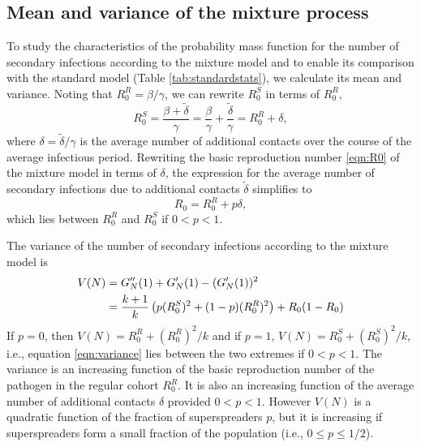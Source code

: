 \documentclass{imammb}
\numberwithin{equation}{section}
\begin{document}


\subsection{Mean and variance of the mixture process} %
To study the characteristics of the probability mass function for the number of secondary infections according to the mixture model and to enable its comparison with the standard model (Table \ref{tab:standardstats}), we calculate its mean and variance.  Noting that $R_0^R = \beta/\gamma$,  we can rewrite $R_0^S$ in terms of $R_0^R$,
\begin{equation}
R_0^S = \frac{\beta + \tilde{\delta}}{\gamma} = \frac{\beta}{\gamma} + \frac{ \tilde{\delta}}{\gamma} = R_0^R + \delta, 
\end{equation}
where $\delta =\tilde{\delta}/\gamma$ is the average number of additional contacts over the course of the average infectious period.  Rewriting the basic reproduction number \eqref{eqn:R0} of the mixture model  in terms of $\delta$, the expression for the average number of secondary infections due to additional contacts $\tilde{\delta}$ simplifies to 
\begin{equation}\label{eqn:R0delta}
R_0 = R_0^R + p \delta,
\end{equation}
which lies between $R_0^R$ and $R_0^S$ if $0<p<1$. 

The variance of the number of secondary infections according to the mixture model is %
\begin{align}\label{eqn:variance}
V(N) &= G_N''(1) + G_N'(1) -  (G_N'(1))^2 \notag \\ &= \frac{k+1}{k} \left (p (R_0^S)^2 + (1-p) (R_0^R)^2  \right ) +R_0(1-R_0)%
\end{align}
If $p=0$, then $V(N) = R_0^R + (R_0^R)^2/k$ and if $p=1$, $V(N) = R_0^S + (R_0^S)^2/k$, i.e., equation \eqref{eqn:variance} lies between the two extremes if $0<p<1$. The variance is an increasing function of the basic reproduction number of the pathogen in the regular cohort $R_0^R$. It is also an increasing function of the average number of additional contacts $\delta$ provided $0<p<1$. However $V(N)$ is a quadratic function of the fraction of superspreaders $p$, but it is increasing if superspreaders form a small fraction of the population (i.e., $0\leq p \leq 1/2$).
\end{document}
